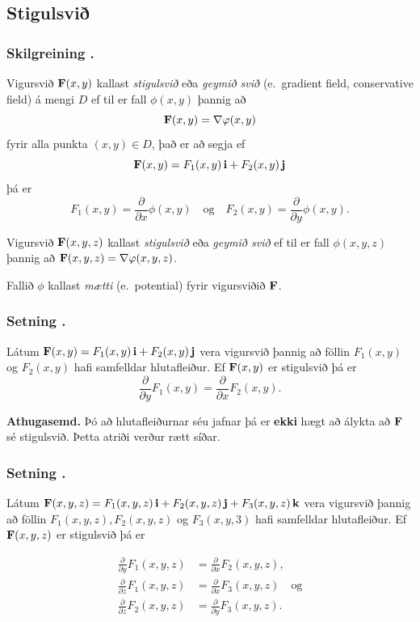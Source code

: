 \subsection{Stigulsvið} 

\subsubsection{Skilgreining \kaflanr.}
Vigursvið $\mbox{${\bf F}$}(x,y)$ kallast {\em stigulsvið} eða {\em geymið svið}
(e.~gradient field, conservative  field) á mengi $D$ ef til er fall $\phi(x,y)$ þannig að $$\mbox{${\bf F}$}(x,y)=\nabla\varphi(x,y)$$ fyrir alla punkta $(x,y)\in D$, það er að segja ef 
$$\mbox{${\bf F}$}(x,y)=F_1(x,y)\,\mbox{${\bf i}$}+F_2(x,y)\,\mbox{${\bf j}$}$$ þá er $$F_1(x,y)=\frac{\partial}{\partial x}\phi(x,y) \quad \text{og}\quad  F_2(x,y)=\frac{\partial}{\partial y}\phi(x,y).$$

Vigursvið $\mbox{${\bf F}$}(x,y,z)$ kallast {\em stigulsvið} eða  {\em geymið svið} ef til er fall $\phi(x,y,z)$ þannig að $\mbox{${\bf F}$}(x,y,z)=\nabla\varphi(x,y,z)$. 

\medskip
Fallið $\phi$ kallast {\em mætti} (e.~potential) fyrir vigursviðið $\mbox{${\bf F}$}$.



\subsubsection{Setning \kaflanr.}
 Látum $\mbox{${\bf F}$}(x,y)=F_1(x,y)\,\mbox{${\bf i}$}+F_2(x,y)\,\mbox{${\bf j}$}$ vera vigursvið þannig að föllin $F_1(x,y)$ og $F_2(x,y)$ hafi samfelldar hlutafleiður.  Ef $\mbox{${\bf F}$}(x,y)$ er stigulsvið þá er 
$$\frac{\partial}{\partial y}F_1(x,y)=
\frac{\partial}{\partial x}F_2(x,y).$$

\smallskip

{\bf Athugasemd.}  Þó að hlutafleiðurnar séu jafnar
þá er {\bf ekki} hægt að álykta að $\mbox{${\bf F}$}$ sé stigulsvið.  Þetta
atriði verður rætt síðar.
 



\subsubsection{Setning \kaflanr.}
Látum
$\mbox{${\bf F}$}(x,y,z)=F_1(x,y,z)\,\mbox{${\bf i}$}+F_2(x,y,z)\,\mbox{${\bf j}$}+F_3(x,y,z)\,\mbox{${\bf k}$}$ vera vigursvið
þannig að föllin $F_1(x,y,z), F_2(x,y,z)$ og $F_3(x,y,3)$ hafi
samfelldar hlutafleiður.  Ef $\mbox{${\bf F}$}(x,y,z)$ er stigulsvið þá er  

\begin {align*}
\frac{\partial}{\partial y}F_1(x,y,z) &=
\frac{\partial}{\partial x}F_2(x,y,z), \\
\frac{\partial}{\partial z}F_1(x,y,z) &=
\frac{\partial}{\partial x}F_3(x,y,z) \quad \text{og} \\
\frac{\partial}{\partial z}F_2(x,y,z)&=
\frac{\partial}{\partial y}F_3(x,y,z).
\end {align*}






